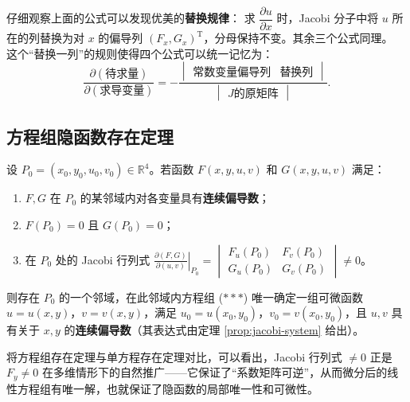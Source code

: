 \documentclass[lang=cn,11pt]{elegantbook}
\begin{document}
\begin{remark}[公式的规律]
仔细观察上面的公式可以发现优美的\textbf{替换规律}：
求 $\dfrac{\partial u}{\partial x}$ 时，Jacobi 分子中将 $u$ 所在的列替换为对 $x$ 的偏导列 $(F_x,G_x)^{\mathrm{T}}$，分母保持不变。其余三个公式同理。
这个“替换一列”的规则使得四个公式可以统一记忆为：
\[
\frac{\partial(\text{待求量})}{\partial(\text{求导变量})}
=-\frac{
\begin{vmatrix}
  \text{常数变量偏导列} & \text{替换列}
\end{vmatrix}}
{
\begin{vmatrix}
  J\text{的原矩阵}
\end{vmatrix}}.
\]
\end{remark}

\subsection{方程组隐函数存在定理}

\begin{theorem}[方程组形式的隐函数存在定理] \label{thm:implicit-system-exist}
设 $P_0=(x_0,y_0,u_0,v_0)\in\mathbb R^4$。若函数 $F(x,y,u,v)$ 和 $G(x,y,u,v)$ 满足：
\begin{enumerate}
  \item[(A')] $F,G$ 在 $P_0$ 的某邻域内对各变量具有\textbf{连续偏导数}；
  \item[(B')] $F(P_0)=0$ 且 $G(P_0)=0$；
  \item[(C')] 在 $P_0$ 处的 Jacobi 行列式
        $\displaystyle\left.\frac{\partial(F,G)}{\partial(u,v)}\right|_{P_0}
        =
        \begin{vmatrix}
          F_u(P_0)&F_v(P_0)\\
          G_u(P_0)&G_v(P_0)
        \end{vmatrix}
        \neq 0$。
\end{enumerate}
则存在 $P_0$ 的一个邻域，在此邻域内方程组 ($\ast\ast\ast$) 唯一确定一组可微函数 $u=u(x,y)$，$v=v(x,y)$，满足 $u_0=u(x_0,y_0)$，$v_0=v(x_0,y_0)$，且 $u,v$ 具有关于 $x,y$ 的\textbf{连续偏导数}（其表达式由定理 \ref{prop:jacobi-system} 给出）。
\end{theorem}

\begin{note}[定理结构的类比]
将方程组存在定理与单方程存在定理对比，可以看出，Jacobi 行列式 $\neq 0$ 正是 $F_y \neq 0$ 在多维情形下的自然推广——它保证了“系数矩阵可逆”，从而微分后的线性方程组有唯一解，也就保证了隐函数的局部唯一性和可微性。
\end{note}
\end{document}
